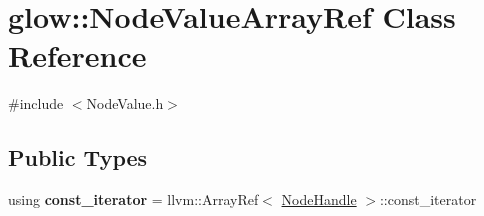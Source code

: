 \hypertarget{classglow_1_1_node_value_array_ref}{}\section{glow\+:\+:Node\+Value\+Array\+Ref Class Reference}
\label{classglow_1_1_node_value_array_ref}


{\ttfamily \#include $<$Node\+Value.\+h$>$}

\subsection*{Public Types}
\begin{DoxyCompactItemize}
\item 
\mbox{\label{classglow_1_1_node_value_array_ref_acc697ac650c1ac41c95d8276e4478ea6}} 
using {\bfseries const\+\_\+iterator} = llvm\+::\+Array\+Ref$<$ \hyperlink{structglow_1_1_node_handle}{Node\+Handle} $>$\+::const\+\_\+iterator
\end{DoxyCompactItemize}
